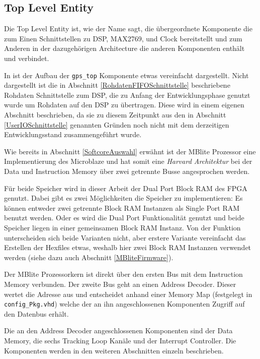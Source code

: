 \subsection{Top Level Entity}
Die Top Level Entity ist, wie der Name sagt, die übergeordnete Komponente die zum Einen Schnittstellen zu DSP, MAX2769, und Clock bereitstellt und zum Anderen in der dazugehörigen Architecture die anderen Komponenten enthält und verbindet.

In  ist der Aufbau der \lstinline$gps_top$ Komponente etwas vereinfacht dargestellt. Nicht dargestellt ist die in Abschnitt \ref{RohdatenFIFOSchnittstelle} beschriebene Rohdaten Schnittstelle zum DSP, die zu Anfang der Entwicklungsphase genutzt wurde um Rohdaten auf den DSP zu übertragen. Diese wird in einem eigenen Abschnitt beschrieben, da sie zu diesem Zeitpunkt aus den in Abschnitt \ref{UserIOSchnittstelle} genannten Gründen noch nicht mit dem derzeitigen Entwicklungsstand zusammengeführt wurde.


Wie bereits in Abschnitt \ref{SoftcoreAuswahl} erwähnt ist der  MBlite Prozessor eine Implementierung des Microblaze und hat somit eine \emph{Harvard Architektur} bei der Data und Instruction Memory über zwei getrennte Busse angesprochen werden.

Für beide Speicher wird in dieser Arbeit der Dual Port Block RAM des FPGA genutzt. Dabei gibt es zwei Möglichkeiten die Speicher zu implementieren: Es können entweder zwei getrennte Block RAM Instanzen als Single Port RAM benutzt werden. Oder es wird die Dual Port Funktionalität genutzt und beide Speicher liegen in  einer gemeinsamen Block RAM Instanz. Von der Funktion unterscheiden sich beide Varianten nicht, aber erstere Variante vereinfacht das Erstellen der Hexfiles etwas, weshalb hier zwei Block RAM Instanzen verwendet werden (siehe dazu auch Abschnitt \ref{MBliteFirmware}).

Der MBlite Prozessorkern ist direkt über den ersten Bus mit dem Instruction Memory verbunden. Der zweite Bus geht an einen Address Decoder. Dieser wertet die Adresse aus und entscheidet anhand einer Memory Map (festgelegt in \lstinline$config_Pkg.vhd$) welche der an ihn angeschlossenen Komponenten Zugriff auf den Datenbus erhält.

Die an den Address Decoder angeschlossenen Komponenten sind der Data Memory, die sechs Tracking Loop Kanäle und der Interrupt Controller. Die Komponenten werden in den weiteren Abschnitten einzeln beschrieben.